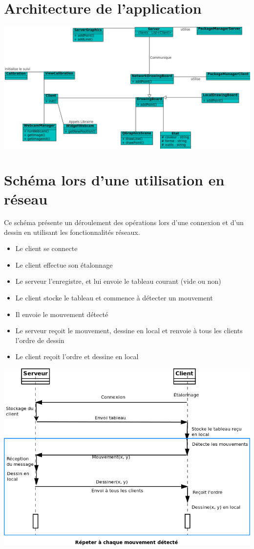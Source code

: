 \documentclass{article}
\begin{document}
\section{Architecture de l'application}
	\begin{center}
	\includegraphics[scale=0.68]{../uml/classes.png}
	\end{center}

\section{Schéma lors d'une utilisation en réseau}
Ce schéma présente un déroulement des opérations lors d'une connexion et d'un dessin en utilisant les fonctionnalités réseaux.\\

\begin{itemize}
	\item Le client se connecte
	\item Le client effectue son étalonnage
	\item Le serveur l'enregistre, et lui envoie le tableau courant (vide ou non)
	\item Le client stocke le tableau et commence à détecter un mouvement
	\item Il envoie le mouvement détecté
	\item Le serveur reçoit le mouvement, dessine en local et renvoie à tous les clients l'ordre de dessin
	\item Le client reçoit l'ordre et dessine en local
\end{itemize}

\begin{center}
	\includegraphics[scale=0.5]{../uml/sequence_reseau.png}
\end{center}

\end{document}
